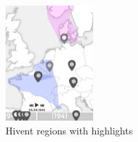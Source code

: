   \begin{figure}[H]
\begin{center}
  \includegraphics[width=0.3\textwidth]{graphics/status2.png}
  \end{center}

  \caption{Hivent regions with highlights}
  \label{fig:hivent_region_highlight}
  \end{figure}


